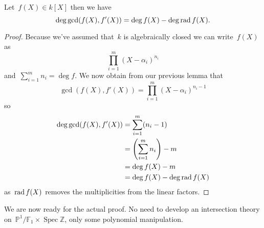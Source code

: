 \begin{lemma}
  \label{lemma:number-of-roots}
  Let~$f(X)\in k[X]$ then we have
  \begin{equation}
    \deg\gcd(f(X),f'(X))=\deg f(X)-\deg\operatorname{rad} f(X).
  \end{equation}

  \begin{proof}
    Because we've assumed that~$k$ is algebraically closed we can write~$f(X)$ as
    \begin{equation}
      \prod_{i=1}^m(X-\alpha_i)^{n_i}
    \end{equation}
    and~$\sum_{i=1}^mn_i=\deg f$. We now obtain from our previous lemma that
    \begin{equation}
      \gcd(f(X),f'(X))=\prod_{i=1}^m(X-\alpha_i)^{n_i-1}
    \end{equation}
    so
    \begin{equation}
      \begin{aligned}
        \deg\gcd(f(X),f'(X))&=\sum_{i=1}^m(n_i-1) \\
        &=\left( \sum_{i=1}^mn_i \right)-m \\
        &=\deg f(X)-m \\
        &=\deg f(X)-\deg\operatorname{rad} f(X)
      \end{aligned}
    \end{equation}
    as~$\operatorname{rad} f(X)$ removes the multiplicities from the linear factors.
  \end{proof}
\end{lemma}

We are now ready for the actual proof. No need to develop an intersection theory on~$\mathbb{P}^1/\mathbb{F}_1\times\operatorname{Spec}\mathbb{Z}$, only some polynomial manipulation.


